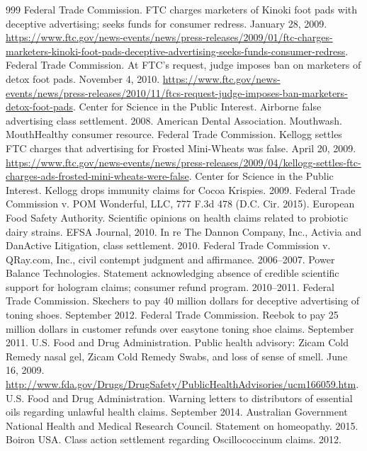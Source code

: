 \documentclass[11pt,oneside]{book}
\begin{document}
\begin{thebibliography}{999}
Federal Trade Commission. FTC charges marketers of Kinoki foot pads with deceptive advertising; seeks funds for consumer redress. January 28, 2009. \url{https://www.ftc.gov/news-events/news/press-releases/2009/01/ftc-charges-marketers-kinoki-foot-pads-deceptive-advertising-seeks-funds-consumer-redress}.
Federal Trade Commission. At FTC's request, judge imposes ban on marketers of detox foot pads. November 4, 2010. \url{https://www.ftc.gov/news-events/news/press-releases/2010/11/ftcs-request-judge-imposes-ban-marketers-detox-foot-pads}.
Center for Science in the Public Interest. Airborne false advertising class settlement. 2008.
American Dental Association. Mouthwash. MouthHealthy consumer resource.
Federal Trade Commission. Kellogg settles FTC charges that advertising for Frosted Mini-Wheats was false. April 20, 2009. \url{https://www.ftc.gov/news-events/news/press-releases/2009/04/kellogg-settles-ftc-charges-ads-frosted-mini-wheats-were-false}.
Center for Science in the Public Interest. Kellogg drops immunity claims for Cocoa Krispies. 2009.
Federal Trade Commission v. POM Wonderful, LLC, 777 F.3d 478 (D.C. Cir. 2015).
European Food Safety Authority. Scientific opinions on health claims related to probiotic dairy strains. EFSA Journal, 2010.
In re The Dannon Company, Inc., Activia and DanActive Litigation, class settlement. 2010.
Federal Trade Commission v. QRay.com, Inc., civil contempt judgment and affirmance. 2006--2007.
Power Balance Technologies. Statement acknowledging absence of credible scientific support for hologram claims; consumer refund program. 2010--2011.
Federal Trade Commission. Skechers to pay 40 million dollars for deceptive advertising of toning shoes. September 2012.
Federal Trade Commission. Reebok to pay 25 million dollars in customer refunds over easytone toning shoe claims. September 2011.
U.S. Food and Drug Administration. Public health advisory: Zicam Cold Remedy nasal gel, Zicam Cold Remedy Swabs, and loss of sense of smell. June 16, 2009. \url{http://www.fda.gov/Drugs/DrugSafety/PublicHealthAdvisories/ucm166059.htm}.
U.S. Food and Drug Administration. Warning letters to distributors of essential oils regarding unlawful health claims. September 2014.
Australian Government National Health and Medical Research Council. Statement on homeopathy. 2015.
Boiron USA. Class action settlement regarding Oscillococcinum claims. 2012.

\end{thebibliography}
\end{document}
